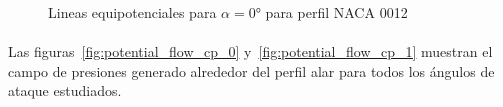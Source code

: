 \documentclass[letterpaper, openright, 12pt]{book}
\begin{document}
    \begin{figure}[htbp!]
        \centering
        \caption{Lineas equipotenciales para $\alpha = 0\si{\degree}$ para
          perfil NACA 0012}
        \label{fig:potential_flow_potential}
    \end{figure}

    \paragraph*{}
    Las figuras~\ref{fig:potential_flow_cp_0} y~\ref{fig:potential_flow_cp_1}
    muestran el campo de presiones generado alrededor del perfil alar para todos
    los ángulos de ataque estudiados.
\end{document}
